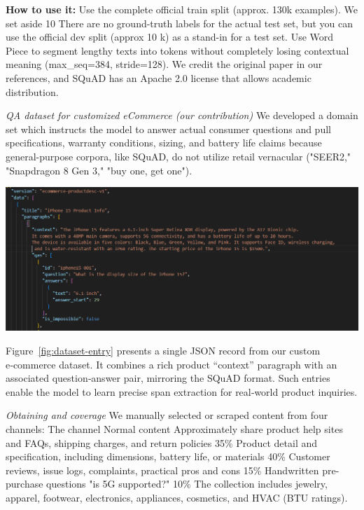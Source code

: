 \documentclass[10pt,conference]{IEEEtran}
\begin{document}
\textbf{How to use it: }  
 Use the complete official train split (approx. 130k examples). 
 We set aside 10%
 There are no ground-truth labels for the actual test set, but you can use the official dev split (approx 10 k) as a stand-in for a test set.
 Use Word Piece to segment lengthy texts into tokens without completely losing contextual meaning (max\_seq=384, stride=128).
 We credit the original paper in our references, and SQuAD has an Apache 2.0 license that allows academic distribution.
 
\textit{QA dataset for customized eCommerce (our contribution)}
We developed a domain set which instructs the model to answer actual consumer questions and pull specifications, warranty conditions, sizing, and battery life claims because general-purpose corpora, like SQuAD, do not utilize retail vernacular ("SEER2," "Snapdragon 8 Gen 3," "buy one, get one"). \\

\begin{minipage}[t]{0.45\textwidth}   %
  \centering
  \includegraphics[width=\linewidth]{fig1.png}
  \label{fig:dataset-entry}
\end{minipage}


Figure~\ref{fig:dataset-entry} presents a single JSON record from our custom e‑commerce dataset. 
It combines a rich product “context” paragraph with an associated question‑answer pair, mirroring the SQuAD format.  
Such entries enable the model to learn precise span extraction for real‑world product inquiries.


\textit{Obtaining and coverage}
We manually selected or scraped content from four channels:
The channel Normal content Approximately share product help sites and FAQs, shipping charges, and return policies 35\%
Product detail and specification, including dimensions, battery life, or materials 40\%
Customer reviews, issue logs, complaints, practical pros and cons 15\%
Handwritten pre-purchase questions "is 5G supported?" 10\%
The collection includes jewelry, apparel, footwear, electronics, appliances, cosmetics, and HVAC (BTU ratings).
\end{document}
